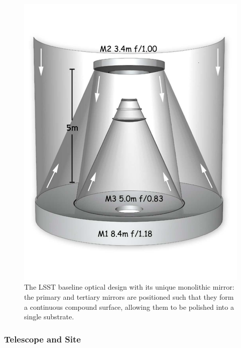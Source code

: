 \documentclass{emulateapj}
\begin{document}
\begin{figure}
\vskip -0.5in
\includegraphics[width=1.0\hsize,clip]{mirrors.pdf}
\vskip -0.5in
\caption{The LSST baseline optical design with its unique 
monolithic mirror: the primary and tertiary mirrors are positioned such 
that they form a continuous compound surface, allowing them to be polished 
into a single substrate.}
\label{Fig:optics}
\end{figure}



\subsubsection{ Telescope and Site}
\end{document}
